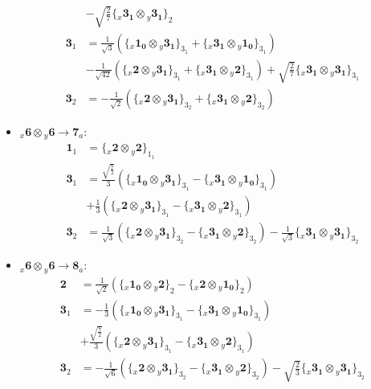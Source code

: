 \documentclass[english]{article}
\newcommand{\rep}[1]{\mathbf{#1}}
\newcommand{\repx}[2]{{}_{#2}\mathbf{#1}}
\newcommand{\tsprodx}[2]{\repx{#1}{x}\otimes\repx{#2}{y}}
\newcommand{\subcgs}[3]{\big\{ \tsprodx{#1}{#2}\big\}^{}_{#3}}
\begin{document}
\begin{itemize}
\begin{align*}
 & -\sqrt{\frac{2}{7}}\subcgs{3_{1}}{3_{1}}{2}
\\
\rep{3}_{1} & = \frac{1}{\sqrt{3}}\left(\subcgs{1_{0}}{3_{1}}{3_{1}}+\subcgs{3_{1}}{1_{0}}{3_{1}}\right) \\ 
 & -\frac{1}{\sqrt{42}}\left(\subcgs{2}{3_{1}}{3_{1}}+\subcgs{3_{1}}{2}{3_{1}}\right)+\sqrt{\frac{2}{7}}\subcgs{3_{1}}{3_{1}}{3_{1}}
\\
\rep{3}_{2} & = -\frac{1}{\sqrt{2}}\left(\subcgs{2}{3_{1}}{3_{2}}+\subcgs{3_{1}}{2}{3_{2}}\right)
\end{align*}
\item $\tsprodx{6}{6}\to\rep{7}_{a}$:
\begin{align*}
\rep{1}_{1} & = \subcgs{2}{2}{1_{1}}
\\
\rep{3}_{1} & = \frac{\sqrt{\frac{7}{2}}}{3}\left(\subcgs{1_{0}}{3_{1}}{3_{1}}-\subcgs{3_{1}}{1_{0}}{3_{1}}\right) \\ 
 & +\frac{1}{3}\left(\subcgs{2}{3_{1}}{3_{1}}-\subcgs{3_{1}}{2}{3_{1}}\right)
\\
\rep{3}_{2} & = \frac{1}{\sqrt{3}}\left(\subcgs{2}{3_{1}}{3_{2}}-\subcgs{3_{1}}{2}{3_{2}}\right)-\frac{1}{\sqrt{3}}\subcgs{3_{1}}{3_{1}}{3_{2}}
\end{align*}
\item $\tsprodx{6}{6}\to\rep{8}_{a}$:
\begin{align*}
\rep{2} & = \frac{1}{\sqrt{2}}\left(\subcgs{1_{0}}{2}{2}-\subcgs{2}{1_{0}}{2}\right)
\\
\rep{3}_{1} & = -\frac{1}{3}\left(\subcgs{1_{0}}{3_{1}}{3_{1}}-\subcgs{3_{1}}{1_{0}}{3_{1}}\right) \\ 
 & +\frac{\sqrt{\frac{7}{2}}}{3}\left(\subcgs{2}{3_{1}}{3_{1}}-\subcgs{3_{1}}{2}{3_{1}}\right)
\\
\rep{3}_{2} & = -\frac{1}{\sqrt{6}}\left(\subcgs{2}{3_{1}}{3_{2}}-\subcgs{3_{1}}{2}{3_{2}}\right)-\sqrt{\frac{2}{3}}\subcgs{3_{1}}{3_{1}}{3_{2}}
\end{align*}
\end{itemize}
\end{document}
